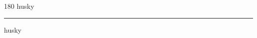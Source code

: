 
\begin{frame}
\begin{center}
\begin{turn}{180}
{\fontsize{2.5cm}{1em}\selectfont husky}
\end{turn}
\vspace{1em}\par  
\hrule
\vspace{1em}\par  
{\fontsize{2.5cm}{1em}\selectfont husky}
\end{center}
\end{frame}
